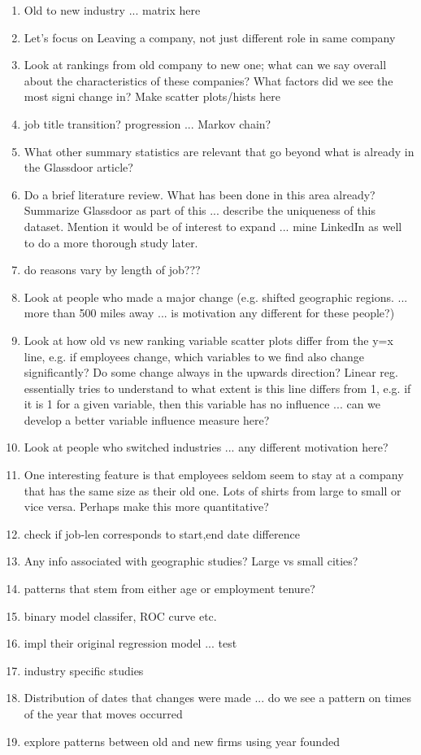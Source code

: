 \documentclass[10pt]{article}
\begin{document}
\begin{enumerate}
    \item Old to new industry ... matrix here 
    \item Let's focus on Leaving a company, not just different role in same company 
    \item Look at rankings from old company to new one; what can we say overall about 
         the characteristics of these companies?  What factors did we see the most signi
         change in? Make scatter plots/hists here 
    \item job title transition? progression ... Markov chain? 
    \item What other summary statistics are relevant that go beyond what is already in 
          the Glassdoor article? 
    \item Do a brief literature review.  What has been done in this area already?
          Summarize Glassdoor as part of this ... describe the uniqueness of this dataset. 
          Mention it would be of interest to expand ... mine LinkedIn as well to do a 
          more thorough study later. 
    \item do reasons vary by length of job??? 
    \item Look at people who made a major change (e.g. shifted geographic regions. ... more than 500 miles 
          away ... is motivation any different for these people?)
    \item Look at how old vs new ranking variable scatter plots differ from the y=x line, 
        e.g. if employees change, which variables to we find also change significantly?  
          Do some change always in the upwards direction? Linear reg. essentially tries 
          to understand to what extent is this line differs from 1, e.g. if it is 1 for 
          a given variable, then this variable has no influence ... can we develop a 
          better variable influence measure here? 
    \item Look at people who switched industries ... any different motivation here? 
    \item One interesting feature is that employees seldom seem to stay at a company that has the 
          same size as their old one.  Lots of shirts from large to small or vice versa.  Perhaps 
          make this more quantitative? 
    \item  check if job-len corresponds to start,end date difference 
    \item Any info associated with geographic studies?  Large vs small cities? 
    \item  patterns that stem from either age or employment tenure? 
    \item binary model classifer, ROC curve etc. 
    \item impl their original regression model ... test 
    \item  industry specific studies 
    \item Distribution of dates that changes were made ... do we see a pattern on times of the 
          year that moves occurred 
    \item explore patterns between old and new firms using year founded 
\end{enumerate}
\end{document}
